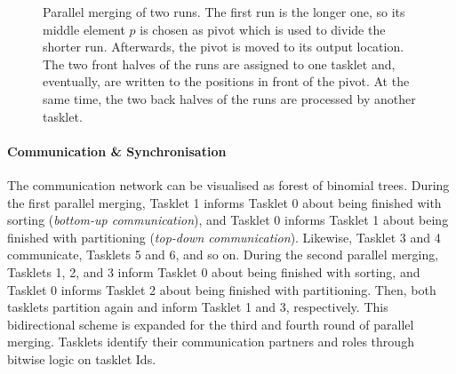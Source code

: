 \begin{figure}
	\caption{
		Parallel merging of two runs.
		The first run is the longer one, so its middle element \(p\) is chosen as pivot which is used to divide the shorter run.
		Afterwards, the pivot is moved to its output location.
		The two front halves of the runs are assigned to one tasklet and, eventually, are written to the positions in front of the pivot.
		At the same time, the two back halves of the runs are processed by another tasklet.
		\cite[Figure~27.6]{cormen2013algorithmen}
	}
	\label{fig:par:merge}
\end{figure}


\paragraph{Communication \& Synchronisation}
The communication network can be visualised as forest of binomial trees.
During the first parallel merging, Tasklet 1 informs Tasklet 0 about being finished with sorting (\emph{bottom-up communication}), and Tasklet 0 informs Tasklet 1 about being finished with partitioning (\emph{top-down communication}).
Likewise, Tasklet 3 and 4 communicate, Tasklets 5 and 6, and so on.
During the second parallel merging, Tasklets 1, 2, and 3 inform Tasklet 0 about being finished with sorting, and Tasklet 0 informs Tasklet 2 about being finished with partitioning.
Then, both tasklets partition again and inform Tasklet 1 and 3, respectively.
This bidirectional scheme is expanded for the third and fourth round of parallel merging.
Tasklets identify their communication partners and roles through bitwise logic on tasklet Ids.

